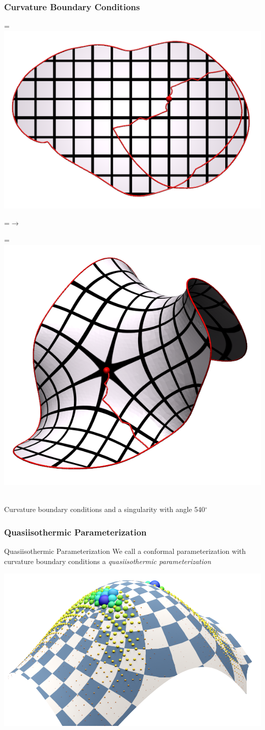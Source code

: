 \documentclass[12pt]{beamer}
\newcommand*{\vcenteredhbox}[1]{\begingroup
\setbox0=\hbox{#1}\parbox{\wd0}{\box0}\endgroup}
\begin{document}
\begin{frame}
  \frametitle{Curvature Boundary Conditions}
	\begin{center}
	\vcenteredhbox{\includegraphics[width=0.45\linewidth]{conformal_curvature_domain.png}}
	\vcenteredhbox{$\rightarrow$}
	\vcenteredhbox{\includegraphics[width=0.45\linewidth]{conformal_curvature.png}}\\
	Curvature boundary conditions and a singularity with angle 540$^\circ$
	\end{center}
\end{frame}


\begin{frame}
	\frametitle{Quasiisothermic Parameterization}
	\begin{block}{Quasiisothermic Parameterization}
        	We call a conformal parameterization with curvature boundary conditions
		a \emph{quasiisothermic parameterization}
	\end{block}
	\begin{center}
		\includegraphics[width=0.7\linewidth]{dach02_quality.png}
	\end{center}
\end{frame}
\end{document}
